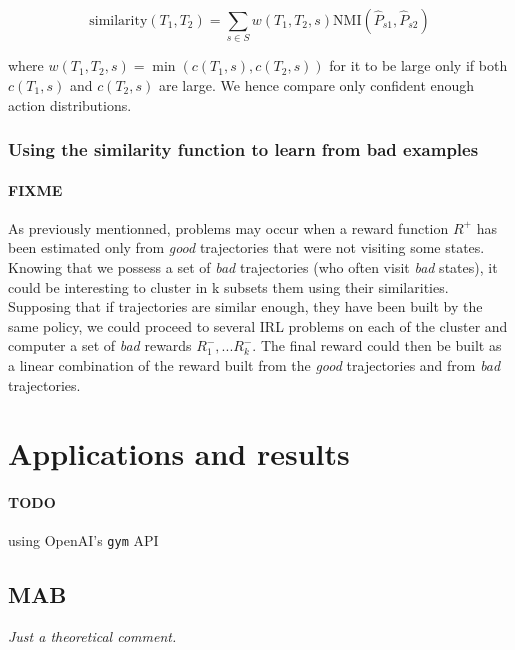 \documentclass{article}
\begin{document}
\[
\text{similarity}(T_1, T_2) = \sum_{s \in S}w(T_1, T_2, s)\text{NMI}(\hat P_{s1}, \hat P_{s2})
\]

where $w(T_1, T_2, s) = \min(c(T_1,s), c(T_2,s))$ for it to be large only if both $c(T_1,s)$ and $c(T_2,s)$ are large. We hence compare only confident enough action distributions.


\subsubsection{Using the similarity function to learn from bad examples}

\paragraph{FIXME}

As previously mentionned, problems may occur when a reward function $R^+$ has been estimated only from \emph{good} trajectories that were not visiting some states. Knowing that we possess a set of \emph{bad} trajectories (who often visit \emph{bad} states), it could be interesting to cluster in k subsets them using their similarities. Supposing that if trajectories are similar enough, they have been built by the same policy, we could proceed to several IRL problems on each of the cluster and computer a set of \emph{bad} rewards ${{R}_{1}^{-},...{R}_{k}^{-}}$. 
The final reward could then be built as a linear combination of the reward built from the \emph{good} trajectories and from \emph{bad} trajectories.

\section{Applications and results \label{sec:results}}

\paragraph{TODO}

using OpenAI's \verb|gym| API

\subsection{MAB}

\emph{Just a theoretical comment.}
\end{document}
